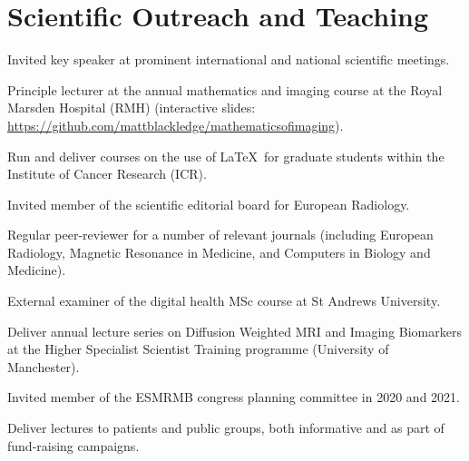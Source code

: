 \documentclass[]{mbcv}
\begin{document}
\section{Scientific Outreach and Teaching}
\vspace*{10pt}
\begin{tightemize}
\item Invited key speaker at prominent international and national scientific meetings.
\item Principle lecturer at the annual mathematics and imaging course at the Royal Marsden Hospital (RMH) (interactive slides: \href{https://github.com/mattblackledge/mathematicsofimaging}{https://github.com/mattblackledge/mathematicsofimaging}).
\item Run and deliver courses on the use of \LaTeX\  for graduate students within the Institute of Cancer Research (ICR). 
\item Invited member of the scientific editorial board for European Radiology.
\item Regular peer-reviewer for a number of relevant journals (including European Radiology, Magnetic Resonance in Medicine, and Computers in Biology and Medicine).
\item External examiner of the digital health MSc course at St Andrews University.
\item Deliver annual lecture series on Diffusion Weighted MRI and Imaging Biomarkers at the Higher Specialist Scientist Training programme (University of Manchester).
\item Invited member of the ESMRMB congress planning committee in 2020 and 2021.
\item Deliver lectures to patients and public groups, both informative and as part of fund-raising campaigns. 
\end{tightemize}
\sectionsep
\end{document}
